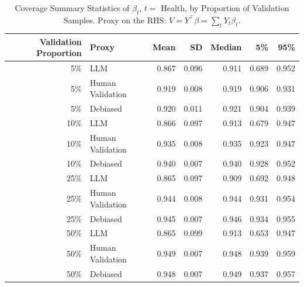 \begin{table}

\caption{Coverage Summary Statistics of $\beta_{t}$, $t=$ Health, by Proportion of Validation Samples.
      Proxy on the RHS: $V = Y^\top \beta = \sum_{t} Y_t \beta_t$.}
\centering
\begin{tabular}[t]{rlrrrrr}
\toprule
Validation Proportion & Proxy & Mean & SD & Median & 5\% & 95\%\\
\midrule
5\% & LLM & 0.867 & 0.096 & 0.911 & 0.689 & 0.952\\
5\% & Human Validation & 0.919 & 0.008 & 0.919 & 0.906 & 0.931\\
5\% & Debiased & 0.920 & 0.011 & 0.921 & 0.904 & 0.939\\
10\% & LLM & 0.866 & 0.097 & 0.913 & 0.679 & 0.947\\
10\% & Human Validation & 0.935 & 0.008 & 0.935 & 0.923 & 0.947\\
10\% & Debiased & 0.940 & 0.007 & 0.940 & 0.928 & 0.952\\
25\% & LLM & 0.865 & 0.097 & 0.909 & 0.692 & 0.948\\
25\% & Human Validation & 0.944 & 0.008 & 0.944 & 0.931 & 0.954\\
25\% & Debiased & 0.945 & 0.007 & 0.946 & 0.934 & 0.955\\
50\% & LLM & 0.865 & 0.099 & 0.913 & 0.653 & 0.947\\
50\% & Human Validation & 0.949 & 0.007 & 0.948 & 0.939 & 0.959\\
50\% & Debiased & 0.948 & 0.007 & 0.949 & 0.937 & 0.957\\
\bottomrule
\end{tabular}
\end{table}
